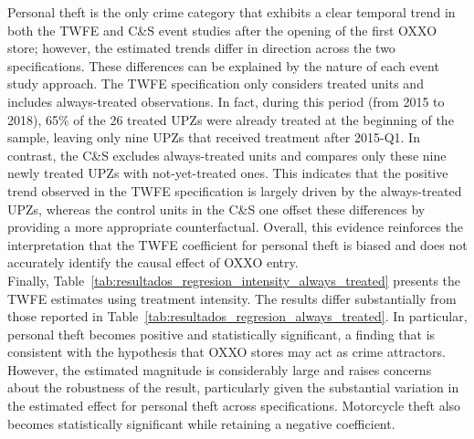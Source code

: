 \documentclass[12pt]{article}
\begin{document}
Personal theft is the only crime category that exhibits a clear temporal trend in both the TWFE and C\&S event studies after the opening of the first OXXO store; however, the estimated trends differ in direction across the two specifications. These differences can be explained by the nature of each event study approach. The TWFE specification only considers treated units and includes always-treated observations. In fact, during this period (from 2015 to 2018), 65\% of the 26 treated UPZs were already treated at the beginning of the sample, leaving only nine UPZs that received treatment after 2015-Q1. In contrast, the C\&S excludes always-treated units and compares only these nine newly treated UPZs with not-yet-treated ones. This indicates that the positive trend observed in the TWFE specification is largely driven by the always-treated UPZs, whereas the control units in the C\&S one offset these differences by providing a more appropriate counterfactual. Overall, this evidence reinforces the interpretation that the TWFE coefficient for personal theft is biased and does not accurately identify the causal effect of OXXO entry.\\

Finally, Table~\ref{tab:resultados_regresion_intensity_always_treated} presents the TWFE estimates using treatment intensity. The results differ substantially from those reported in Table~\ref{tab:resultados_regresion_always_treated}. In particular, personal theft becomes positive and statistically significant, a finding that is consistent with the hypothesis that OXXO stores may act as crime attractors. However, the estimated magnitude is considerably large and raises concerns about the robustness of the result, particularly given the substantial variation in the estimated effect for personal theft across specifications. Motorcycle theft also becomes statistically significant while retaining a negative coefficient.\\
\end{document}
